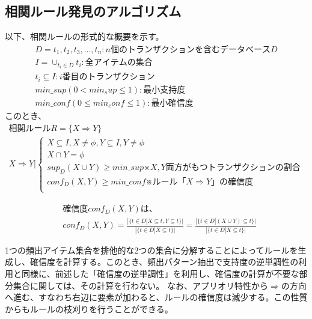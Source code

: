 \documentclass[dvipdfmx]{jsarticle}
\begin{document}
\subsection{相関ルール発見のアルゴリズム}
以下、相関ルールの形式的な概要を示す。
\begin{gather*}
  D = {t_{1}, t_{2}, t_{3},..., t_{n}}:n個のトランザクションを含むデータベースD\\
  I = \cup_{t_{i}\in D}t_{i}:全アイテムの集合 \\
  t_{i} \subseteq I:i番目のトランザクション \\
  min\_sup(0 < min_sup \le 1):最小支持度 \\
  min\_conf(0 \le min_conf \le 1):最小確信度
\end{gather*}
このとき、
\begin{gather*}
  相関ルールR = \{ X \Rightarrow Y \} \\
  X \Rightarrow Y |
  \begin{cases}
    {X \subseteq I, X \neq \phi , Y \subseteq I, Y \neq \phi} \\
    {X \cap Y = \phi} \\
    {sup_{D}(X\cup Y) \geq min\_sup}　※X,Y両方がもつトランザクションの割合\\
    {conf_{D}(X, Y) \geq min\_conf}　※ルール「X \Rightarrow Y」の確信度\\
  \end{cases}
\end{gather*}
\begin{fleqn}
  \begin{align*}
    &確信度conf_{D}(X, Y)は、\\
    &conf_{D}(X, Y) = \frac{|\{t\in D |X \subseteq t, Y \subseteq t\}|}{|\{ t\in D | X \subseteq t\}|}
    = \frac{|\{ t \in D | (X\cup Y) \subseteq t\}|}{|\{ t \in D | X \subseteq t\}|}
  \end{align*}
\end{fleqn}
1つの頻出アイテム集合を排他的な2つの集合に分解することによってルールを生成し、確信度を計算する。このとき、頻出パターン抽出で支持度の逆単調性の利用と同様に、前述した「確信度の逆単調性」を利用し、確信度の計算が不要な部分集合に関しては、その計算を行わない。
なお、アプリオリ特性から$\Rightarrow$の方向へ進む、すなわち右辺に要素が加わると、ルールの確信度は減少する。この性質からもルールの枝刈りを行うことができる。
\end{document}
